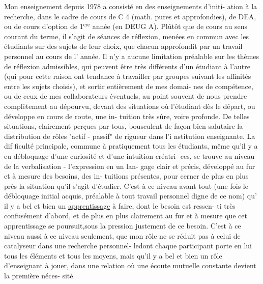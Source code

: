 
Mon enseignement depuis 1978 a consisté en des enseignements d'initi-%
ation à la recherche, dans le cadre de cours de C 4 (math. pures et
approfondies), de DEA, ou de cours d'option de 1$^{\text{ere}}$ année (en DEUG A).
Plûtôt que de cours au sens courant du terme, il s'agit de séances de
réflexion, menées en commun avec les étudiants sur des sujets de leur
choix, que chacun approfondit par un travail personnel au cours de l'
année. Il n'y a aucune limitation préalable sur les thèmes de réflexion
admissibles, qui peuvent être très différents d'un étudiant à l'autre
(qui pour cette raison ont tendance à travailler par groupes suivant les
affinités entre les sujets choisis), et sortir entièrement de mes domai-%
nes de compétence, ou de ceux de mes collaborateurs éventuels, au point
souvent de nous prendre complètement au dépourvu, devant des situations
où l'étudiant  dès le départ, ou développe en cours de route, une in-%
tuition très sûre, voire profonde. De telles situations, clairement
perçues par tous, bousculent de façon bien salutaire la distribution de
rôles "actif - passif" de rigueur dans l'i nstitution enseignante. La dif
ficulté principale, commune à pratiquement tous les étudiants, 
même qu'il y a eu débloquage d'une curiosité et d'une intuition créatri-%
ces, se trouve au niveau de la verbalisation - l'expression en un lan-%
gage clair et précis, développé au fur et à mesure des besoins, des in-%
tuitions présentes, pour cerner de plus en plus près la situation qu'il
s'agit d'étudier. C'est à ce niveau avant tout (une fois le débloquage
initial acquis, préalable à tout travail personnel digne de ce nom) qu'
il y a bel et bien un \uline{apprentissage} à faire, dont le besoin est ressen-%
ti très confusément d'abord, et de plus en plus clairement au fur et à
mesure que cet apprentissage se poursuit,sous la pression justement de
ce besoin. C'est à ce niveau aussi  à ce niveau seulement, que mon
rôle ne se réduit pas à celui de catalyseur dans une recherche personnel-%
le\hand{(}dont chaque participant porte en lui tous les éléments et tous les
moyens\hand{)}, mais qu'il y a bel et bien un rôle d'enseignant à jouer, dans
une relation où une écoute mutuelle constante devient la première néces-%
sité.


